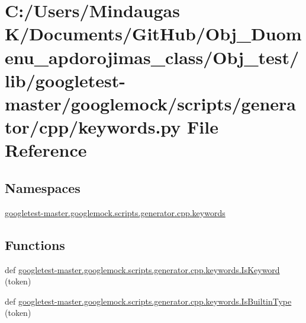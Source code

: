 \hypertarget{_obj__test_2lib_2googletest-master_2googlemock_2scripts_2generator_2cpp_2keywords_8py}{}\section{C\+:/\+Users/\+Mindaugas K/\+Documents/\+Git\+Hub/\+Obj\+\_\+\+Duomenu\+\_\+apdorojimas\+\_\+class/\+Obj\+\_\+test/lib/googletest-\/master/googlemock/scripts/generator/cpp/keywords.py File Reference}
\label{_obj__test_2lib_2googletest-master_2googlemock_2scripts_2generator_2cpp_2keywords_8py}
\subsection*{Namespaces}
\begin{DoxyCompactItemize}
\item 
 \mbox{\hyperlink{namespacegoogletest-master_1_1googlemock_1_1scripts_1_1generator_1_1cpp_1_1keywords}{googletest-\/master.\+googlemock.\+scripts.\+generator.\+cpp.\+keywords}}
\end{DoxyCompactItemize}
\subsection*{Functions}
\begin{DoxyCompactItemize}
\item 
def \mbox{\hyperlink{namespacegoogletest-master_1_1googlemock_1_1scripts_1_1generator_1_1cpp_1_1keywords_ae39caec181b04df21d40b49b7ee0d958}{googletest-\/master.\+googlemock.\+scripts.\+generator.\+cpp.\+keywords.\+Is\+Keyword}} (token)
\item 
def \mbox{\hyperlink{namespacegoogletest-master_1_1googlemock_1_1scripts_1_1generator_1_1cpp_1_1keywords_a867188e9559a17bf6004fa94c7b5a27e}{googletest-\/master.\+googlemock.\+scripts.\+generator.\+cpp.\+keywords.\+Is\+Builtin\+Type}} (token)
\end{DoxyCompactItemize}
